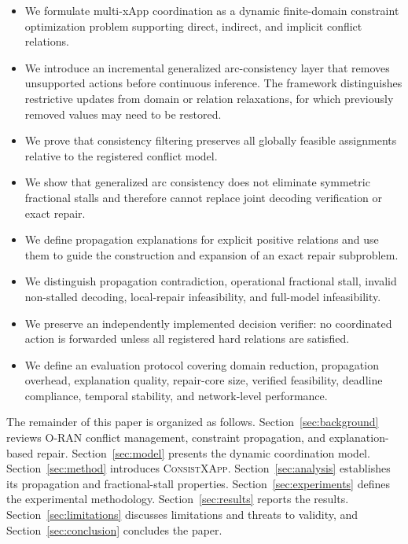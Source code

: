 \documentclass[pdflatex,sn-mathphys-num,iicol,oneside]{sn-jnl}
\newcommand{\method}{\textsc{ConsistXApp}}
\begin{document}
\begin{itemize}
    \item We formulate multi-xApp coordination as a dynamic
    finite-domain constraint optimization problem supporting direct,
    indirect, and implicit conflict relations.

    \item We introduce an incremental generalized arc-consistency
    layer that removes unsupported actions before continuous
    inference. The framework distinguishes restrictive updates from
    domain or relation relaxations, for which previously removed
    values may need to be restored.

    \item We prove that consistency filtering preserves all globally
    feasible assignments relative to the registered conflict model.

    \item We show that generalized arc consistency does not eliminate
    symmetric fractional stalls and therefore cannot replace joint
    decoding verification or exact repair.

    \item We define propagation explanations for explicit positive
    relations and use them to guide the construction and expansion
    of an exact repair subproblem.

    \item We distinguish propagation contradiction, operational
    fractional stall, invalid non-stalled decoding, local-repair
    infeasibility, and full-model infeasibility.

    \item We preserve an independently implemented decision verifier:
    no coordinated action is forwarded unless all registered hard
    relations are satisfied.

    \item We define an evaluation protocol covering domain reduction,
    propagation overhead, explanation quality, repair-core size,
    verified feasibility, deadline compliance, temporal stability,
    and network-level performance.
\end{itemize}

The remainder of this paper is organized as follows.
Section~\ref{sec:background} reviews O-RAN conflict management,
constraint propagation, and explanation-based repair.
Section~\ref{sec:model} presents the dynamic coordination model.
Section~\ref{sec:method} introduces \method.
Section~\ref{sec:analysis} establishes its propagation and
fractional-stall properties.
Section~\ref{sec:experiments} defines the experimental methodology.
Section~\ref{sec:results} reports the results.
Section~\ref{sec:limitations} discusses limitations and threats to
validity, and Section~\ref{sec:conclusion} concludes the paper.
\end{document}
